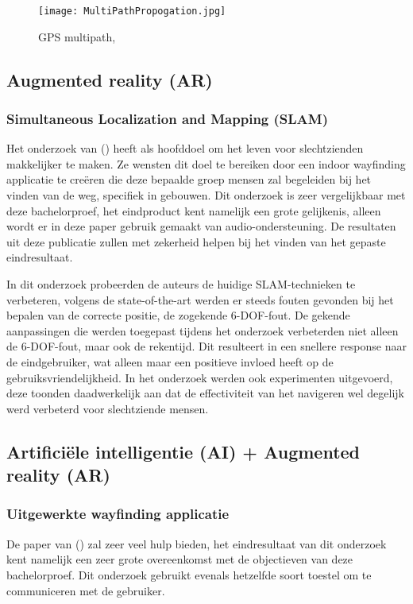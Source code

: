 \begin{figure}[H]
	\centering
	\texttt{[image: MultiPathPropogation.jpg]}
	\caption{GPS multipath, \autocite{Haikun2017}}
\end{figure}


\subsection{Augmented reality (AR)}

\subsubsection{Simultaneous Localization and Mapping (SLAM)}
Het onderzoek van \textcite{Zhang2017} () heeft als hoofddoel om het leven voor slechtzienden makkelijker te maken. Ze wensten dit doel te bereiken door een indoor wayfinding applicatie te creëren die deze bepaalde groep mensen zal begeleiden bij het vinden van de weg, specifiek in gebouwen. Dit onderzoek is zeer vergelijkbaar met deze bachelorproef, het eindproduct kent namelijk een grote gelijkenis, alleen wordt er in deze paper gebruik gemaakt van audio-ondersteuning. De resultaten uit deze publicatie zullen met zekerheid helpen bij het vinden van het gepaste eindresultaat.

In dit onderzoek probeerden de auteurs de huidige SLAM-technieken te verbeteren, volgens de state-of-the-art werden er steeds fouten gevonden bij het bepalen van de correcte positie, de zogekende 6-DOF-fout. De gekende aanpassingen die werden toegepast tijdens het onderzoek verbeterden niet alleen de 6-DOF-fout, maar ook de rekentijd. Dit resulteert in een snellere response naar de eindgebruiker, wat alleen maar een positieve invloed heeft op de gebruiksvriendelijkheid. In het onderzoek werden ook experimenten uitgevoerd, deze toonden daadwerkelijk aan dat de effectiviteit van het navigeren wel degelijk werd verbeterd voor slechtziende mensen.

\subsection{Artificiële intelligentie (AI) + Augmented reality (AR)}
\subsubsection{Uitgewerkte wayfinding applicatie}
De paper van \textcite{Pouria2016} () zal zeer veel hulp bieden, het eindresultaat van dit onderzoek kent namelijk een zeer grote overeenkomst met de objectieven van deze bachelorproef. Dit onderzoek gebruikt evenals hetzelfde soort toestel om te communiceren met de gebruiker.

